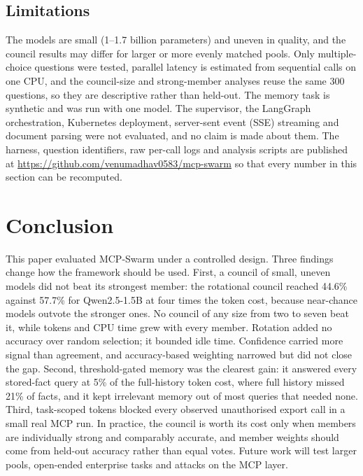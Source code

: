 \subsection{Limitations}
The models are small (1--1.7 billion parameters) and uneven in quality, and the council results may differ for larger or more evenly matched pools. Only multiple-choice questions were tested, parallel latency is estimated from sequential calls on one CPU, and the council-size and strong-member analyses reuse the same 300 questions, so they are descriptive rather than held-out. The memory task is synthetic and was run with one model. The supervisor, the LangGraph orchestration, Kubernetes deployment, server-sent event (SSE) streaming and document parsing were not evaluated, and no claim is made about them. The harness, question identifiers, raw per-call logs and analysis scripts are published at \url{https://github.com/venumadhav0583/mcp-swarm} so that every number in this section can be recomputed.

\section{Conclusion}
This paper evaluated MCP-Swarm under a controlled design. Three findings change how the framework should be used. First, a council of small, uneven models did not beat its strongest member: the rotational council reached 44.6\% against 57.7\% for Qwen2.5-1.5B at four times the token cost, because near-chance models outvote the stronger ones. No council of any size from two to seven beat it, while tokens and CPU time grew with every member. Rotation added no accuracy over random selection; it bounded idle time. Confidence carried more signal than agreement, and accuracy-based weighting narrowed but did not close the gap. Second, threshold-gated memory was the clearest gain: it answered every stored-fact query at 5\% of the full-history token cost, where full history missed 21\% of facts, and it kept irrelevant memory out of most queries that needed none. Third, task-scoped tokens blocked every observed unauthorised export call in a small real MCP run. In practice, the council is worth its cost only when members are individually strong and comparably accurate, and member weights should come from held-out accuracy rather than equal votes. Future work will test larger pools, open-ended enterprise tasks and attacks on the MCP layer.
